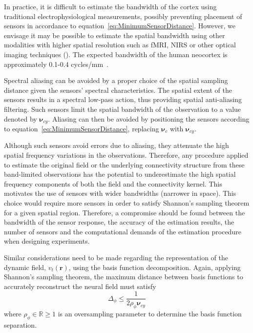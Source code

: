 \documentclass[review,authoryear,3p]{elsarticle}
\begin{document}
In practice, it is difficult to estimate the bandwidth of the cortex using traditional electrophysiological measurements, possibly preventing placement of sensors in accordance to equation~\ref{eq:MinimumSensorDistance}. However, we envisage it may be possible to estimate the spatial bandwidth using other modalities with higher spatial resolution such as fMRI, NIRS or other optical imaging techniques (\cite{Issa2000}). The expected bandwidth of the human neocortex is approximately 0.1-0.4 cycles/mm~\citep{Freeman2000}.

Spectral aliasing can be avoided by a proper choice of the spatial sampling distance given the sensors' spectral characteristics. The spatial extent of the sensors results in a spectral low-pass action, thus providing spatial anti-aliasing filtering. Such sensors limit the spatial bandwidth of the observation to a value denoted by $\boldsymbol{\nu}_{cy}$. Aliasing can then be avoided by positioning the sensors according to equation~\ref{eq:MinimumSensorDistance}, replacing $\boldsymbol{\nu}_c$ with $\boldsymbol{\nu}_{cy}$.

Although such sensors avoid errors due to aliasing, they attenuate the high spatial frequency variations in the observations. Therefore, any procedure applied to estimate the original field or the underlying connectivity structure from these band-limited observations has the potential to underestimate the high spatial frequency components of both the field and the connectivity kernel. This motivates the use of sensors with wider bandwidths (narrower in space). This choice would require more sensors in order to satisfy Shannon's sampling theorem for a given spatial region. Therefore, a compromise should be found between the bandwidth of the sensor response, the accuracy of the estimation results, the number of sensors and the computational demands of the estimation procedure when designing experiments.

Similar considerations need to be made regarding the representation of the dynamic field, $v_t(\mathbf{r})$, using the basis function decomposition. Again, applying Shannon's sampling theorem, the maximum distance between basis functions to accurately reconstruct the neural field must satisfy 
\begin{equation}\label{eq:BasisFunctionSeparation}
	\Delta_{\phi} \leq \frac{1}{2\rho_{\phi}\boldsymbol{\nu}_{cy}}
\end{equation}
where $\rho_{\phi} \in \mathbb{R} \ge 1$ is an oversampling parameter to determine the basis function separation. 
\end{document}
